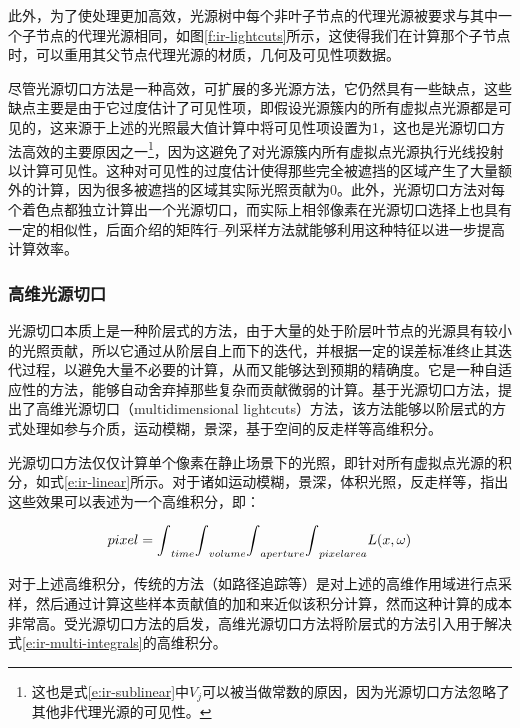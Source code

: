 此外，为了使处理更加高效，光源树中每个非叶子节点的代理光源被要求与其中一个子节点的代理光源相同，如图\ref{f:ir-lightcuts}所示，这使得我们在计算那个子节点时，可以重用其父节点代理光源的材质，几何及可见性项数据。

尽管光源切口方法是一种高效，可扩展的多光源方法，它仍然具有一些缺点，这些缺点主要是由于它过度估计了可见性项，即假设光源簇内的所有虚拟点光源都是可见的，这来源于上述的光照最大值计算中将可见性项设置为1，这也是光源切口方法高效的主要原因之一\footnote{这也是式\ref{e:ir-sublinear}中$V_j$可以被当做常数的原因，因为光源切口方法忽略了其他非代理光源的可见性。}，因为这避免了对光源簇内所有虚拟点光源执行光线投射以计算可见性。这种对可见性的过度估计使得那些完全被遮挡的区域产生了大量额外的计算，因为很多被遮挡的区域其实际光照贡献为0。此外，光源切口方法对每个着色点都独立计算出一个光源切口，而实际上相邻像素在光源切口选择上也具有一定的相似性，后面介绍的矩阵行--列采样方法就能够利用这种特征以进一步提高计算效率。





\subsubsection{高维光源切口}
光源切口本质上是一种阶层式的方法，由于大量的处于阶层叶节点的光源具有较小的光照贡献，所以它通过从阶层自上而下的迭代，并根据一定的误差标准终止其迭代过程，以避免大量不必要的计算，从而又能够达到预期的精确度。它是一种自适应性的方法，能够自动舍弃掉那些复杂而贡献微弱的计算。基于光源切口方法，\cite{a:MultidimensionalLightcuts}提出了高维光源切口（multidimensional lightcuts）方法，该方法能够以阶层式的方式处理如参与介质，运动模糊，景深，基于空间的反走样等高维积分。

光源切口方法仅仅计算单个像素在静止场景下的光照，即针对所有虚拟点光源的积分，如式\ref{e:ir-linear}所示。对于诸如运动模糊，景深，体积光照，反走样等，\cite{a:DistributedRayTracing}指出这些效果可以表述为一个高维积分，即：

\begin{equation}\label{e:ir-multi-integrals}
	pixel={\rm \int}_{time}{\rm \int}_{volume}{\rm \int}_{aperture}{\rm \int}_{pixel area}L(x,\omega)
\end{equation}

对于上述高维积分，传统的方法（如路径追踪等）是对上述的高维作用域进行点采样，然后通过计算这些样本贡献值的加和来近似该积分计算，然而这种计算的成本非常高。受光源切口方法的启发，高维光源切口方法将阶层式的方法引入用于解决式\ref{e:ir-multi-integrals}的高维积分。


